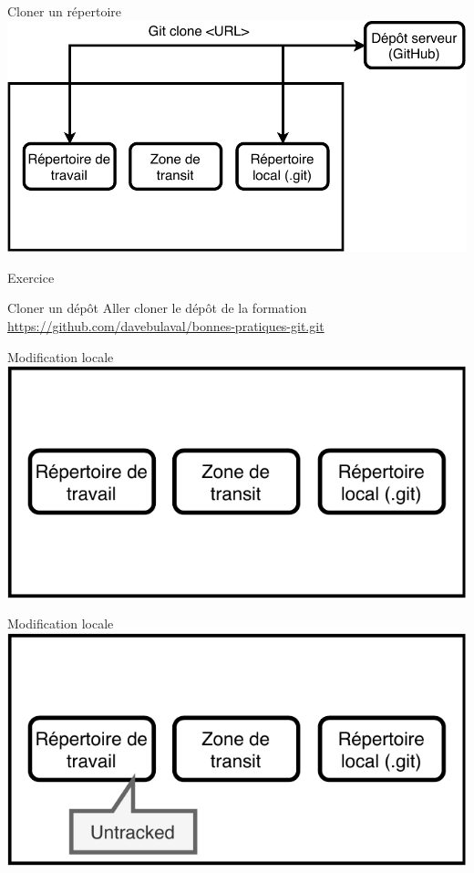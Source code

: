 \documentclass[11pt]{beamer}
\begin{document}
\begin{frame}{Cloner un répertoire}
	\includegraphics[width=0.95\linewidth,height=0.95\textheight,keepaspectratio]{clone.pdf}
\end{frame}

\begin{frame}{Exercice}
	\begin{block}{Cloner un dépôt}
		Aller cloner le dépôt de la formation \url{https://github.com/davebulaval/bonnes-pratiques-git.git}
	\end{block}
\end{frame}

\begin{frame}{Modification locale}
	\includegraphics[width=0.95\linewidth,height=0.95\textheight,keepaspectratio]{stage.pdf}
\end{frame}


\begin{frame}{Modification locale}
	\includegraphics[width=0.95\linewidth,height=0.95\textheight,keepaspectratio]{untracked.pdf}
\end{frame}
\end{document}
